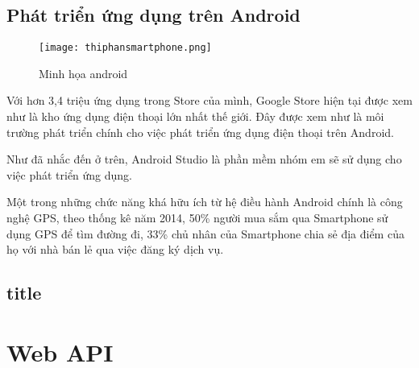 \documentclass[../thesis.tex]{subfiles}
\begin{document}
	\subsection{Phát triển ứng dụng trên Android}	
	\begin{figure}[ht!]
		\centering
		\texttt{[image: thiphansmartphone.png]}
		\caption{Minh họa android}
		\label{fig:minhhoa_android}
	\end{figure}	
	
	Với hơn 3,4 triệu ứng dụng trong Store của mình, Google Store hiện tại được xem như là kho ứng dụng điện thoại lớn nhất thế giới\cite{android:googlestore}. Đây được xem như là môi trường phát triển chính cho việc phát triển ứng dụng điện thoại trên Android.
	
	Như đã nhắc đến ở trên, Android Studio là phần mềm nhóm em sẽ sử dụng cho việc phát triển ứng dụng. 
	
	Một trong những chức năng khá hữu ích từ hệ điều hành Android chính là công nghệ GPS, theo thống kê năm 2014, 50\% người mua sắm qua Smartphone sử dụng GPS để tìm đường đi, 33\% chủ nhân của Smartphone chia sẻ địa điểm của họ với nhà bán lẻ qua việc đăng ký dịch vụ.\cite{android:thongke1}
	
	\subsection{title}

\section{Web API}
\end{document}
